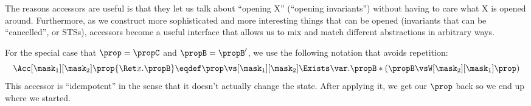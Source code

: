 The reasons accessors are useful is that they let us talk about ``opening X'' (\eg ``opening invariants'') without having to care what X is opened around.
Furthermore, as we construct more sophisticated and more interesting things that can be opened (\eg invariants that can be ``cancelled'', or STSs), accessors become a useful interface that allows us to mix and match different abstractions in arbitrary ways.

For the special case that $\prop = \propC$ and $\propB = \propB'$, we use the following notation that avoids repetition:
\[ \Acc[\mask_1][\mask_2]\prop{\Ret x. \propB} \eqdef \prop \vs[\mask_1][\mask_2] \Exists\var. \propB * (\propB \vsW[\mask_2][\mask_1] \prop)  \]
This accessor is ``idempotent'' in the sense that it doesn't actually change the state.  After applying it, we get our $\prop$ back so we end up where we started.

